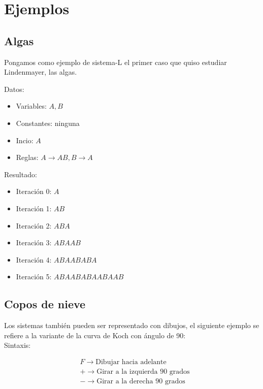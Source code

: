 \section{Ejemplos}

\subsection{Algas}

\noindent Pongamos como ejemplo de sistema-L el primer caso que quiso estudiar Lindenmayer, las algas.

\noindent Datos:

\begin{itemize}
    \item Variables: $A,B$
    \item Constantes: ninguna
    \item Incio: $A$
    \item Reglas: $A \rightarrow AB, B \rightarrow A$
\end{itemize}

\noindent Resultado:

\begin{itemize}
    \item Iteración 0: $A$
    \item Iteración 1: $AB$
    \item Iteración 2: $ABA$
    \item Iteración 3: $ABAAB$
    \item Iteración 4: $ABAABABA$
    \item Iteración 5: $ABAABABAABAAB$
\end{itemize}

\subsection{Copos de nieve}

\noindent Los sistemas también pueden ser representado con dibujos, el siguiente ejemplo se refiere a la variante de la curva de Koch con ángulo de 90:\\

\noindent Sintaxis:

\begin{equation}
    \begin{split}
        & F\rightarrow \text{Dibujar hacia adelante}\\
        & +\rightarrow \text{Girar a la izquierda } 90 \text{ grados}\\
        & -\rightarrow \text{Girar a la derecha } 90 \text{ grados}\\
    \end{split}
\end{equation}

